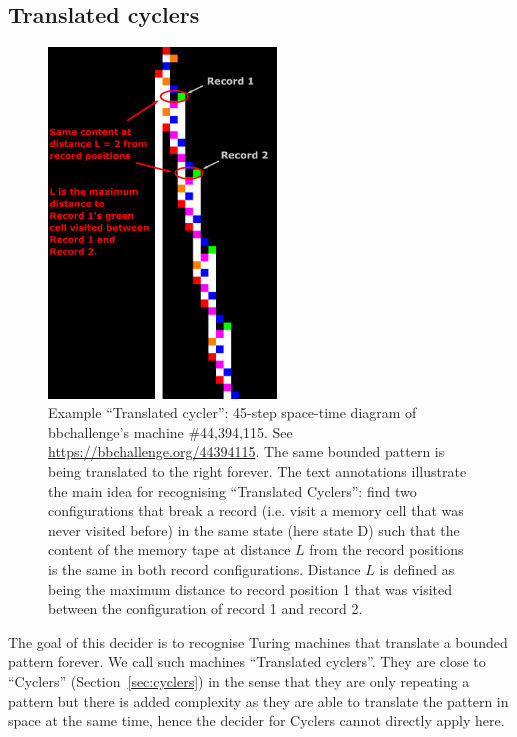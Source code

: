 
\newpage
\subsection{Translated cyclers}\label{sec:translated-cyclers}

\begin{figure}[h!]
  \centering
  \includegraphics[width=0.54\textwidth]{figures/space-time-diagrams/translated_cycler_44394115_annotated.pdf}

  \caption{Example ``Translated cycler'': 45-step space-time diagram of bbchallenge's machine \#44,394,115. See \url{https://bbchallenge.org/44394115}. The same bounded pattern is being translated to the right forever. The text annotations illustrate the main idea for recognising ``Translated Cyclers'': find two configurations that break a record (i.e. visit a memory cell that was never visited before) in the same state (here state \textcolor{colorD}{D}) such that the content of the memory tape at distance $L$ from the record positions is the same in both record configurations. Distance $L$ is defined as being the maximum distance to record position 1 that was visited between the configuration of record 1 and record 2.}\label{fig:translated-cyclers}
\end{figure}

The goal of this decider is to recognise Turing machines that translate a bounded pattern forever. We call such machines ``Translated cyclers''. They are close to ``Cyclers'' (Section~\ref{sec:cyclers}) in the sense that they are only repeating a pattern but there is added complexity as they are able to translate the pattern in space at the same time, hence the decider for Cyclers cannot directly apply here.

